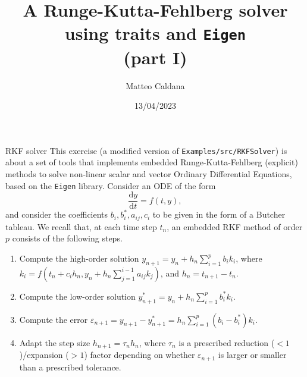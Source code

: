 \documentclass[10pt]{beamer}
\begin{document}
    \title{A Runge-Kutta-Fehlberg solver\protect\\using traits and \texttt{Eigen}\protect\\(part I)}
    \author{Matteo Caldana}
    \date{13/04/2023}

\begin{frame}
    \maketitle
\end{frame}

\begin{frame}{RKF solver}
This exercise (a modified version of \texttt{Examples/src/RKFSolver}) is about a set of tools that implements embedded Runge-Kutta-Fehlberg (explicit) methods to solve non-linear scalar and vector Ordinary Differential Equations, based on the \texttt{Eigen} library.
\vfill
Consider an ODE of the form
\begin{equation*}
\frac{\mathrm{d} y}{\mathrm{d} t} = f(t, y),
\end{equation*}
and consider the coefficients \(b_i, b_i^*, a_{ij}, c_i\) to be given in the form of a Butcher tableau.
We recall that, at each time step \(t_n\), an embedded RKF method of order \(p\) consists of the following steps.
\begin{enumerate}
\item Compute the high-order solution \(y_{n+1} = y_{n} + h_n \sum_{i=1}^p b_i k_i\), where \(k_i = f\left(t_n + c_i h_n, y_n + h_n\sum_{j=1}^{i-1}a_{ij}k_j\right)\), and \(h_n = t_{n+1} - t_n\).
\item Compute the low-order solution \(y_{n+1}^* = y_{n} + h_n \sum_{i=1}^p b_i^* k_i\).
\item Compute the error \(\varepsilon_{n+1} = y_{n+1} - y_{n+1}^* = h_n \sum_{i=1}^p(b_i - b_i^*)k_i\).
\item Adapt the step size \(h_{n+1} = \tau_{n} h_{n}\), where \(\tau_{n}\) is a prescribed reduction (\(<1\))/expansion (\(>1\)) factor depending on whether \(\varepsilon_{n+1}\) is larger or smaller than a prescribed tolerance.
\end{enumerate}
\end{frame}
\end{document}
